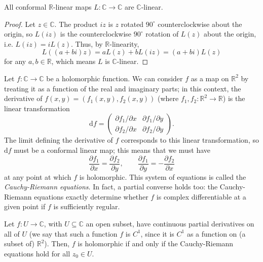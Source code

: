 \documentclass[10pt]{article}
\providecommand{\dd}{\mathrm d}
\providecommand{\CC}{\mathbb C}
\providecommand{\RR}{\mathbb R}
\providecommand{\vocab}[1]{{{\sffamily\textit{#1}}}}
\begin{document}
\begin{prop}
    \label{prop:conformal-is-complex-mult}
    All conformal $\RR$-linear maps $L\colon\CC\to\CC$ are $\CC$-linear.
\end{prop}

\begin{proof}
    Let $z\in\CC$. The product $iz$ is $z$ rotated
    $90^\circ$ counterclockwise about the origin,
    so $L(iz)$ is the counterclockwise $90^\circ$ rotation
    of $L(z)$ about the origin, i.e. $L(iz) = iL(z)$.
    Thus, by $\RR$-linearity,
    \begin{equation*}
        L((a+bi)z) = aL(z) + bL(iz) = (a+bi)L(z)
    \end{equation*}
    for any $a,b\in\RR$, which means $L$ is $\CC$-linear.
\end{proof}

Let $f\colon\CC\to\CC$ be a holomorphic function.
We can consider $f$ as a map on $\RR^2$ by treating it as
a function of the real and imaginary parts;
in this context, the derivative of $f(x,y) = (f_1(x,y),f_2(x,y))$
(where $f_1,f_2\colon\RR^2\to\RR$) is the linear transformation
\begin{equation*}
    \dd f = \begin{pmatrix}
        \partial f_1/\partial x &\partial f_1/\partial y\\
        \partial f_2/\partial x &\partial f_2/\partial y
    \end{pmatrix}.
\end{equation*}
The limit defining the derivative of $f$
corresponds to this linear transformation,
so $\dd f$ must be a conformal linear map; this means that we must have
\begin{equation*}
    \frac{\partial f_1}{\partial x} = \frac{\partial f_2}{\partial y},
    \qquad \frac{\partial f_1}{\partial y} = -\frac{\partial f_2}{\partial x}
\end{equation*}
at any point at which $f$ is holomorphic.
This system of equations is called the \vocab{Cauchy-Riemann equations}.
In fact, a partial converse holds too: the Cauchy-Riemann equations
exactly determine whether $f$ is complex differentiable at a given point
if $f$ is sufficiently regular.

\begin{prop}
    \label{prop:CR-eqns-iff-holomorphic}
    Let $f\colon U\to\CC$, with $U\subseteq\CC$ an open subset,
    have continuous partial derivatives on all of $U$
    (we say that such a function $f$ is $C^1$,
    since it is $C^1$ as a function on (a subset of) $\RR^2$).
    Then, $f$ is holomorphic if and only if
    the Cauchy-Riemann equations hold for all $z_0\in U$.
\end{prop}
\end{document}
